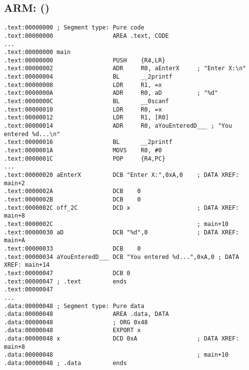 \subsection{ARM: \OptimizingKeilVI (\ThumbMode)}

\begin{lstlisting}
.text:00000000 ; Segment type: Pure code
.text:00000000                 AREA .text, CODE
...
.text:00000000 main
.text:00000000                 PUSH    {R4,LR}
.text:00000002                 ADR     R0, aEnterX     ; "Enter X:\n"
.text:00000004                 BL      __2printf
.text:00000008                 LDR     R1, =x
.text:0000000A                 ADR     R0, aD          ; "%d"
.text:0000000C                 BL      __0scanf
.text:00000010                 LDR     R0, =x
.text:00000012                 LDR     R1, [R0]
.text:00000014                 ADR     R0, aYouEnteredD___ ; "You entered %d...\n"
.text:00000016                 BL      __2printf
.text:0000001A                 MOVS    R0, #0
.text:0000001C                 POP     {R4,PC}
...
.text:00000020 aEnterX         DCB "Enter X:",0xA,0    ; DATA XREF: main+2
.text:0000002A                 DCB    0
.text:0000002B                 DCB    0
.text:0000002C off_2C          DCD x                   ; DATA XREF: main+8
.text:0000002C                                         ; main+10
.text:00000030 aD              DCB "%d",0              ; DATA XREF: main+A
.text:00000033                 DCB    0
.text:00000034 aYouEnteredD___ DCB "You entered %d...",0xA,0 ; DATA XREF: main+14
.text:00000047                 DCB 0
.text:00000047 ; .text         ends
.text:00000047
...
.data:00000048 ; Segment type: Pure data
.data:00000048                 AREA .data, DATA
.data:00000048                 ; ORG 0x48
.data:00000048                 EXPORT x
.data:00000048 x               DCD 0xA                 ; DATA XREF: main+8
.data:00000048                                         ; main+10
.data:00000048 ; .data         ends
\end{lstlisting}

